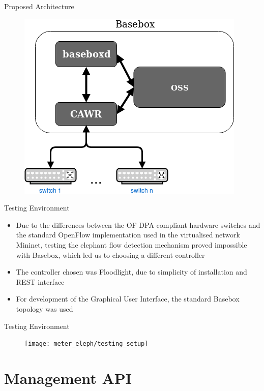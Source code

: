 \documentclass{beamer}
\begin{document}
\begin{frame}{Proposed Architecture}
    \begin{figure}
        \includegraphics[width=.7\textwidth]{proposed_work/proposed_system}
    \end{figure}
\end{frame}

\begin{frame}{Testing Environment}
    \begin{itemize}
        \item Due to the differences between the OF-DPA compliant hardware switches and the standard OpenFlow implementation used in the virtualised 
            network Mininet, testing the elephant flow detection mechanism proved impossible with Basebox, which led us to choosing a different controller
            \pause 
        \item The controller chosen was Floodlight, due to simplicity of installation and REST interface
        \item For development of the Graphical User Interface, the standard Basebox topology was used
    \end{itemize}
\end{frame}

\begin{frame}{Testing Environment}
    \begin{figure}
        \texttt{[image: meter\_eleph/testing\_setup]}
    \end{figure}
\end{frame}

\section{Management API}
\end{document}
